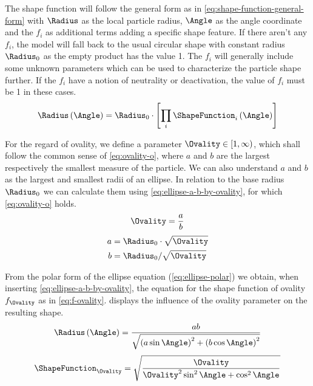 The shape function will follow the general form as in \cref{eq:shape-function-general-form}
with $\Radius$ as the local particle radius, $\Angle$ as the angle coordinate and the $f_i$ as additional terms adding a specific shape feature.
If there aren't any $f_i$, the model will fall back to the usual circular shape with constant radius $\Radius_0$ as the empty product has the value 1.
The $f_i$ will generally include some unknown parameters which can be used to characterize the particle shape further.
If the $f_i$ have a notion of neutrality or deactivation, the value of $f_i$ must be 1 in these cases.
\begin{equation}
    \Radius\left( \Angle \right) = \Radius_0 \cdot \left[ \prod_i \ShapeFunction_i\left( \Angle \right) \right]
    \label{eq:shape-function-general-form}
\end{equation}

For the regard of ovality, we define a parameter $\Ovality \in [ 1, \infty ) $, which shall follow the common sense of \cref{eq:ovality-o},
where $a$ and $b$ are the largest respectively the smallest measure of the particle.
We can also understand $a$ and $b$ as the largest and smallest radii of an ellipse.
In relation to the base radius $\Radius_0$ we can calculate them using \cref{eq:ellipse-a-b-by-ovality}, for which \cref{eq:ovality-o} holds.
\begin{equation}
    \Ovality = \frac{a}{b}
    \label{eq:ovality-o}
\end{equation}
\begin{align}
    a &= \Radius_0 \cdot \sqrt{\Ovality} \\
    b &= \Radius_0 / \sqrt{\Ovality}
    \label{eq:ellipse-a-b-by-ovality}
\end{align}

From the polar form of the ellipse equation (\cref{eq:ellipse-polar}) we obtain, when inserting \cref{eq:ellipse-a-b-by-ovality}, the equation for the shape function of ovality $f_{\Ovality}$ as in \cref{eq:f-ovality}.
 displays the influence of the ovality parameter on the resulting shape.
\begin{equation}
    \Radius \left( \Angle \right) = \frac{ab}{\sqrt{\left( a \sin \Angle \right)^2 + \left( b \cos \Angle \right)^2  }}
    \label{eq:ellipse-polar}
\end{equation}
\begin{equation}
    \ShapeFunction_{\Ovality} = \sqrt{\frac{\Ovality}{\Ovality^2 \sin^2 \Angle + \cos^2 \Angle}}
    \label{eq:f-ovality}
\end{equation}

